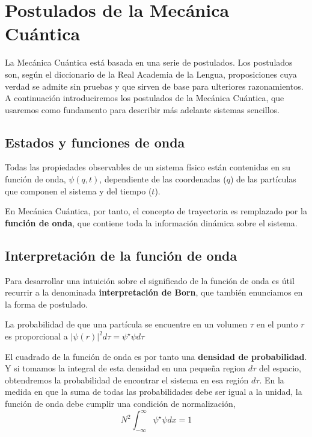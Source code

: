 \chapter{Postulados de la Mecánica Cuántica}
La Mecánica Cuántica está basada en una serie de
postulados. Los postulados son, según el diccionario
de la Real Academia de la Lengua, proposiciones cuya
verdad se admite sin pruebas y que sirven de base para
ulteriores razonamientos. A continuación introduciremos
los postulados de la Mecánica Cuántica, que usaremos 
como fundamento para describir más adelante sistemas
sencillos.

\section*{Estados y funciones de onda}
\begin{theorem}
Todas las propiedades observables de un sistema físico 
están contenidas en su función de onda, $\psi(q,t)$,
dependiente de las coordenadas ($q$) de las
partículas que componen el sistema y del tiempo ($t$). 
\end{theorem}

En Mecánica Cuántica, por tanto, el concepto de 
trayectoria es remplazado por la \textbf{función de
onda}, que contiene toda la información dinámica 
sobre el sistema.

\section{Interpretación de la función de onda}
Para desarrollar una intuición sobre el significado
de la función de onda es útil recurrir a la 
denominada \textbf{interpretación de 
Born}, que también enunciamos en la forma de 
postulado.
\begin{theorem} 
La probabilidad de que una partícula se encuentre en 
un volumen $\tau$ en el punto $r$ es proporcional
a $|\psi(r)|^2d\tau=\psi^\star \psi d\tau$
\end{theorem}
El cuadrado de la función de onda es por tanto una
\textbf{densidad de probabilidad}. Y si tomamos la
integral de esta densidad en una pequeña region 
$d\tau$ del espacio, obtendremos la probabilidad de
encontrar el sistema en esa región $d\tau$. En la 
medida en que la suma de todas las probabilidades
debe ser igual a la unidad, la función de onda debe 
cumplir una condición de normalización,
\begin{equation}
    N^2\int_{-\infty}^\infty\psi^\star\psi dx=1
    \label{eq:norm}
\end{equation}

